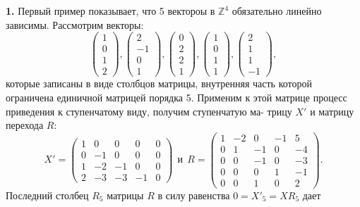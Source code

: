 \documentclass{mai_book}
\begin{document}
	{\bf1.} Первый пример показывает, что 5 вектороы в $\mathbb Z^4$ обязательно\linebreak
	линейно зависимы. Рассмотрим векторы:
	$$\begin{pmatrix} 1 \\ 0 \\ 1 \\ 2 \end{pmatrix}, \begin{pmatrix} 2 \\ -1 \\ 0 \\ 1 \end{pmatrix}, \begin{pmatrix} 0 \\ 2 \\ 2 \\ 1 \end{pmatrix}, \begin{pmatrix} 1 \\ 0 \\ 1 \\ 1 \end{pmatrix}, \begin{pmatrix} 2 \\ 1 \\ 1 \\ -1 \end{pmatrix},$$
	которые записаны в виде столбцов матрицы, внутренняя часть которой\linebreak
	ограничена единичной матрицей порядка 5. Применим к этой матрице\linebreak
	процесс приведения к ступенчатому виду, получим ступенчатую ма-\linebreak
	трицу $X'$ и матрицу перехода $R$:
	$$X' = \begin{pmatrix} 1 & 0 & 0 & 0 & 0\\ 0 & -1 & 0 & 0 & 0 \\ 1 & -2 & -1 & 0 & 0 \\ 2 & -3 & -3 & -1 & 0 \end{pmatrix} \ \ \text{и} \ \ R = \begin{pmatrix} 1 & -2 & 0 & -1 & 5\\ 0 & 1 & -1 & 0 & -4 \\ 0 & 0 & -1 & 0 & -3 \\ 0 & 0 & 0 & 1 & -1 \\ 0 & 0 & 1 & 0 & 2 \end{pmatrix}.$$
	Последний столбец $R_5$ матрицы $R$ в силу равенства $0 = X'_5 = XR_5$ дает\linebreak
\end{document}
